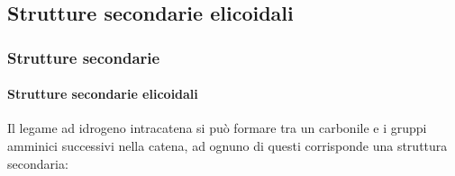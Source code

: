 \documentclass{beamer}
\begin{document}
\subsection{Strutture secondarie elicoidali}
\begin{frame}
\frametitle{Strutture secondarie}
  \framesubtitle{Strutture secondarie elicoidali}
  Il legame ad idrogeno intracatena si può formare tra un carbonile e i gruppi amminici successivi nella catena, 
ad ognuno di questi corrisponde una struttura secondaria:

\begin{itemize}
\end{itemize}
\end{frame}
\end{document}
